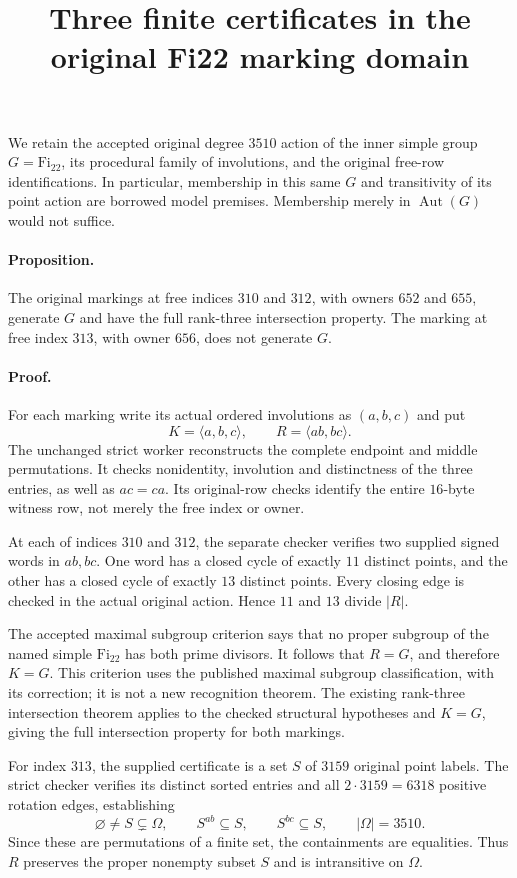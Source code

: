 \documentclass[11pt]{article}
\title{Three finite certificates in the original Fi22 marking domain}
\author{}
\date{}
\newcommand{\Gen}[1]{\langle #1\rangle}
\begin{document}
\maketitle

We retain the accepted original degree $3510$ action of the inner simple
group $G=\mathrm{Fi}_{22}$, its procedural family of involutions, and the
original free-row identifications. In particular, membership in this same
$G$ and transitivity of its point action are borrowed model premises.
Membership merely in $\operatorname{Aut}(G)$ would not suffice.

\paragraph{Proposition.}
The original markings at free indices $310$ and $312$, with owners $652$
and $655$, generate $G$ and have the full rank-three intersection property.
The marking at free index $313$, with owner $656$, does not generate $G$.

\paragraph{Proof.}
For each marking write its actual ordered involutions as $(a,b,c)$ and put
\[
                 K=\Gen{a,b,c},\qquad R=\Gen{ab,bc}.
\]
The unchanged strict worker reconstructs the complete endpoint and middle
permutations. It checks nonidentity, involution and distinctness of the
three entries, as well as $ac=ca$. Its original-row checks identify the
entire $16$-byte witness row, not merely the free index or owner.

At each of indices $310$ and $312$, the separate checker verifies two
supplied signed words in $ab,bc$. One word has a closed cycle of exactly
$11$ distinct points, and the other has a closed cycle of exactly $13$
distinct points. Every closing edge is checked in the actual original
action. Hence $11$ and $13$ divide $|R|$.

The accepted maximal subgroup criterion says that no proper subgroup of
the named simple $\mathrm{Fi}_{22}$ has both prime divisors. It follows
that $R=G$, and therefore $K=G$. This criterion uses the published maximal
subgroup classification, with its correction; it is not a new recognition
theorem. The existing rank-three intersection theorem applies to the
checked structural hypotheses and $K=G$, giving the full intersection
property for both markings.

For index $313$, the supplied certificate is a set $S$ of $3159$ original
point labels. The strict checker verifies its distinct sorted entries and
all $2\cdot3159=6318$ positive rotation edges, establishing
\[
      \varnothing\ne S\subsetneq\Omega,\qquad S^{ab}\subseteq S,
      \qquad S^{bc}\subseteq S,
      \qquad |\Omega|=3510.
\]
Since these are permutations of a finite set, the containments are
equalities. Thus $R$ preserves the proper nonempty subset $S$ and is
intransitive on $\Omega$.
\end{document}
